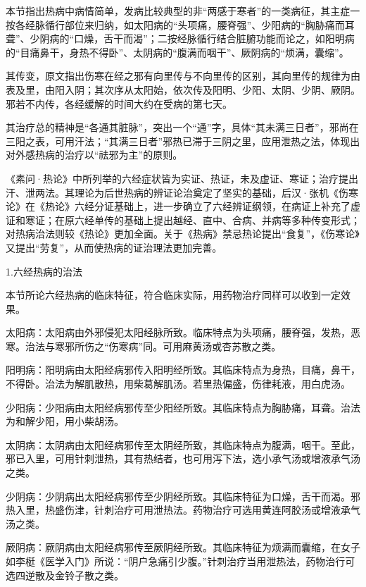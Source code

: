 \documentclass[draft,12pt]{ctexbook}
\begin{document}


本节指出热病中病情简单，发病比较典型的非“两感于寒者”的一类病征，其主症一按各经脉循行部位来归纳，如太阳病的“头项痛，腰脊强”、少阳病的“胸胁痛而耳聋”、少阴病的“口燥，舌干而渴”；二按经脉循行结合脏腑功能而论之，如阳明病的“目痛鼻干，身热不得卧”、太阴病的“腹满而咽干”、厥阴病的“烦满，囊缩”。

其传变，原文指出伤寒在经之邪有向里传与不向里传的区别，其向里传的规律为由表及里，由阳入阴；其次序从太阳始，依次传及阳明、少阳、太阴、少阴、厥阴。邪若不内传，各经缓解的时间大约在受病的第七天。

其治疗总的精神是“各通其脏脉”，突出一个“通”字，具体“其未满三日者”，邪尚在三阳之表，可用汗法；“其满三日者”邪热已滞于三阴之里，应用泄热之法，体现出对外感热病的治疗以“祛邪为主”的原则。

《素问·热论》中所列举的六经症状皆为实证、热证，未及虚证、寒证；治疗提出汗、泄两法。其理论为后世热病的辨证论治奠定了坚实的基础，后汉·张机《伤寒论》在《热论》六经分证基础上，进一步确立了六经辨证纲领，在病证上补充了虚证和寒证；在原六经单传的基础上提出越经、直中、合病、并病等多种传变形式；对热病治法则较《热论》更加全面。关于《热病》禁忌热论提出“食复”，《伤寒论》又提出“劳复”，从而使热病的证治理法更加完善。


1.六经热病的治法

本节所论六经热病的临床特征，符合临床实际，用药物治疗同样可以收到一定效果。

太阳病：太阳病由外邪侵犯太阳经脉所致。临床特点为头项痛，腰脊强，发热，恶寒。治法与寒邪所伤之“伤寒病”同。可用麻黄汤或杏苏散之类。

阳明病：阳明病由太阳经病邪传入阳明经所致。其临床特点为身热，目痛，鼻干，不得卧。治法为解肌散热，用柴葛解肌汤。若里热偏盛，伤律耗液，用白虎汤。

少阳病：少阳病由太阳经病邪传至少阳经所致。其临床特点为胸胁痛，耳聋。治法为和解少阳，用小柴胡汤。

太阴病：太阴病由太阳经病邪传至太阴经所致，其临床特点为腹满，咽干。至此，邪已入里，可用针刺泄热，其有热结者，也可用泻下法，选小承气汤或增液承气汤之类。

少阴病：少阴病出太阳经病邪传至少阴经所致。其临床特征为口燥，舌干而渴。邪热入里，热盛伤津，针刺治疗可用泄热法。药物治疗可选用黄连阿胶汤或增液承气汤之类。

厥阴病：厥阴病由太阳经病邪传至厥阴经所致。其临床特征为烦满而囊缩，在女子如李梃《医学入门》所说：“阴户急痛引少腹。”针刺治疗当用泄热法，药物治行可选四逆散及金铃子散之类。
\end{document}
